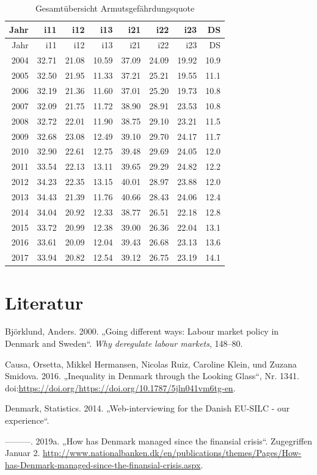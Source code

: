 \documentclass[ngerman,]{article}
\begin{document}
\begin{longtable}[]{@{}rrrrrrrr@{}}
\caption{Gesamtübersicht Armutsgefährdungsquote}\tabularnewline
\toprule
Jahr & i11 & i12 & i13 & i21 & i22 & i23 & DS\tabularnewline
\midrule
\endfirsthead
\toprule
Jahr & i11 & i12 & i13 & i21 & i22 & i23 & DS\tabularnewline
\midrule
\endhead
2004 & 32.71 & 21.08 & 10.59 & 37.09 & 24.09 & 19.92 &
10.9\tabularnewline
2005 & 32.50 & 21.95 & 11.33 & 37.21 & 25.21 & 19.55 &
11.1\tabularnewline
2006 & 32.19 & 21.36 & 11.60 & 37.01 & 25.20 & 19.73 &
10.8\tabularnewline
2007 & 32.09 & 21.75 & 11.72 & 38.90 & 28.91 & 23.53 &
10.8\tabularnewline
2008 & 32.72 & 22.01 & 11.90 & 38.75 & 29.10 & 23.21 &
11.5\tabularnewline
2009 & 32.68 & 23.08 & 12.49 & 39.10 & 29.70 & 24.17 &
11.7\tabularnewline
2010 & 32.90 & 22.61 & 12.75 & 39.48 & 29.69 & 24.05 &
12.0\tabularnewline
2011 & 33.54 & 22.13 & 13.11 & 39.65 & 29.29 & 24.82 &
12.2\tabularnewline
2012 & 34.23 & 22.35 & 13.15 & 40.01 & 28.97 & 23.88 &
12.0\tabularnewline
2013 & 34.43 & 21.39 & 11.76 & 40.66 & 28.43 & 24.06 &
12.4\tabularnewline
2014 & 34.04 & 20.92 & 12.33 & 38.77 & 26.51 & 22.18 &
12.8\tabularnewline
2015 & 33.72 & 20.99 & 12.38 & 39.00 & 26.36 & 22.04 &
13.1\tabularnewline
2016 & 33.61 & 20.09 & 12.04 & 39.43 & 26.68 & 23.13 &
13.6\tabularnewline
2017 & 33.94 & 20.82 & 12.54 & 39.12 & 26.75 & 23.19 &
14.1\tabularnewline
\bottomrule
\end{longtable}

\newpage

\section{Literatur}\label{literatur}

\hypertarget{refs}{}
\hypertarget{ref-bjorklund2000going}{}
Björklund, Anders. 2000. „Going different ways: Labour market policy in
Denmark and Sweden``. \emph{Why deregulate labour markets}, 148--80.

\hypertarget{ref-causa2016inequality}{}
Causa, Orsetta, Mikkel Hermansen, Nicolas Ruiz, Caroline Klein, und
Zuzana Smidova. 2016. „Inequality in Denmark through the Looking
Glass``, Nr. 1341.
doi:\href{https://doi.org/https://doi.org/https://doi.org/10.1787/5jln041vm6tg-en}{https://doi.org/https://doi.org/10.1787/5jln041vm6tg-en}.

\hypertarget{ref-cawistat}{}
Denmark, Statistics. 2014. „Web-interviewing for the Danish EU-SILC -
our experience``.

\hypertarget{ref-statdenm2}{}
---------. 2019a. „How has Denmark managed since the finansial crisis``.
Zugegriffen Januar 2.
\url{http://www.nationalbanken.dk/en/publications/themes/Pages/How-has-Denmark-managed-since-the-finansial-crisis.aspx}.
\end{document}
